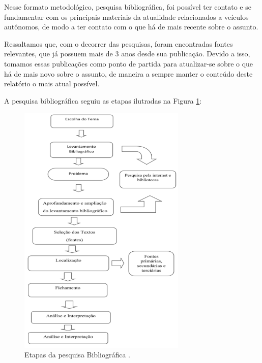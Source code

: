Nesse formato metodológico, pesquisa bibliográfica, foi possível ter contato e se fundamentar com os principais materiais da atualidade relacionados a veículos autônomos, de modo a ter contato com o que há de mais recente sobre o assunto.

Ressaltamos que, com o decorrer das pesquisas, foram encontradas fontes relevantes, que já possuem mais de 3 anos desde sua publicação. Devido a isso, tomamos essas publicações como ponto de partida para atualizar-se sobre o que há de mais novo sobre o assunto, de maneira a sempre manter o conteúdo deste relatório o mais atual possível.

A pesquisa bibliográfica seguiu as etapas ilutradas na Figura \ref{img_bibli}:

\begin{figure}[H]
\centering
\includegraphics[width=8cm]{Figures/bibli.png}
\caption{Etapas da pesquisa Bibliográfica \cite{bibli}.}
\label{img_bibli}
\end{figure}

